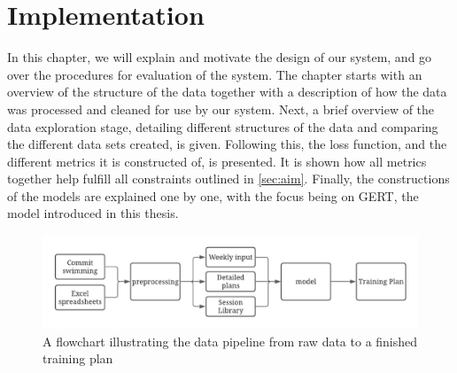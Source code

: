 \chapter{Implementation}

In this chapter, we will explain and motivate the design of our system, and go over the procedures for evaluation of the system.
The chapter starts with an overview of the structure of the data together with a description of how the data was processed and cleaned for use by our system.
Next, a brief overview of the data exploration stage, detailing different structures of the data and comparing the different data sets created, is given.
Following this, the loss function, and the different metrics it is constructed of, is presented.
It is shown how all metrics together help fulfill all constraints outlined in \cref{sec:aim}.
Finally, the constructions of the models are explained one by one, with the focus being on GERT, the model introduced in this thesis.


\label{sec:method}

\begin{figure}
    \centering
    \includegraphics[width=1.0\linewidth]{chapters/figures/implementation_plots/data_pipeline_workflow.pdf}
    \caption{A flowchart illustrating the data pipeline from raw data to a finished training plan}
    \label{fig:data_pipeline}
\end{figure}

